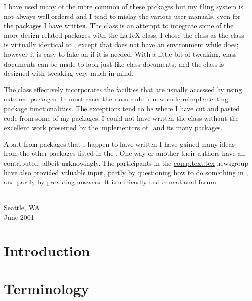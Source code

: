 \documentclass[10pt,a4paper,extrafontsizes]{memoir}
\newcommand\svnidlong[4]{}
\begin{document}
    I have used many of the more common of these packages but my filing system
is not always well ordered and I tend to mislay the various user manuals,
even for the packages I have written. The  class is an attempt
to integrate some of the more design-related packages with the LaTeX
 class. I chose the  class as the  class
is virtually identical to , except that  does
not have an  environment while  does; however it is 
easy to fake an  if it is needed. With a little bit of tweaking,
 class documents can be made to look just like 
class documents, and the  class is designed with tweaking very
much in mind.

    The  class effectively incorporates the facilties that
are usually accessed by using external packages. In most cases the class
code is new code reimplementing package functionalities. The exceptions
tend to be where I have cut and pasted code from some of my packages.
I could not have written the  class without the excellent 
work presented by the implementors of \ltx\ and its many packages.

    Apart from packages that I happen to have written I have gained many
ideas from the other packages listed in the \bibname. One way or another
their authors have all contributed, albeit unknowingly. 
The participants in the
\url{comp.text.tex} newsgroup have also provided valuable input, partly
by questioning how to do something in \ltx, and partly by providing
answers. It is a friendly and educational forum.

{ \\ Seattle, WA \\ June 2001\par}




\svnidlong
{$Ignore: $}
{$LastChangedDate: 2015-04-22 17:17:51 +0200 (Wed, 22 Apr 2015) $}
{$LastChangedRevision: 527 $}
{$LastChangedBy: daleif $}

\chapter{Introduction}


\chapter{Terminology}
\end{document}
